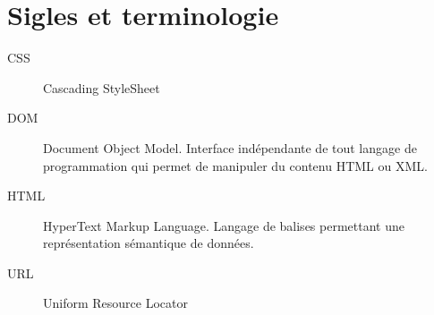 \documentclass[12pt]{article}
\begin{document}
\section{Sigles et terminologie}
    \begin{description}
        \item[CSS] Cascading StyleSheet
        \item[DOM] Document Object Model. Interface indépendante de tout langage de programmation qui permet de manipuler du contenu HTML ou XML.
        \item[HTML] HyperText Markup Language. Langage de balises permettant une représentation sémantique de données.
        \item[URL] Uniform Resource Locator
    \end{description}
\end{document}
